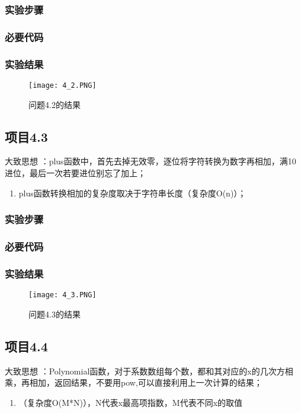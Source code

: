 \subsubsection{实验步骤}
\subsubsection{必要代码}

\subsubsection{实验结果}
	\begin{figure}[!bthp]
	\centering
        \texttt{[image: 4\_2.PNG]}
        \caption{问题4.2的结果}
      \end{figure}

\subsection{项目4.3}
大致思想 ：plus函数中，首先去掉无效零，逐位将字符转换为数字再相加，满10进位，最后一次若要进位别忘了加上；
\begin{enumerate}
\item plus函数转换相加的复杂度取决于字符串长度（复杂度O(n)）；
\end{enumerate}
\subsubsection{实验步骤}
\subsubsection{必要代码}

\subsubsection{实验结果}
		\begin{figure}[!bthp]
	\centering
        \texttt{[image: 4\_3.PNG]}
        \caption{问题4.3的结果}
      \end{figure}

\subsection{项目4.4}
大致思想 ：Polynomial函数，对于系数数组每个数，都和其对应的x的几次方相乘，再相加，返回结果，不要用pow,可以直接利用上一次计算的结果；
\begin{enumerate}
\item （复杂度O(M*N)），N代表x最高项指数，M代表不同x的取值
\end{enumerate}
